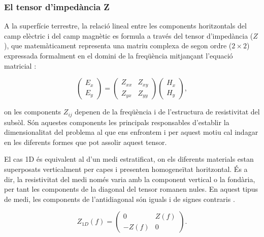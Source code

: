 \documentclass[11pt,a4paper,oneside]{article}
\begin{document}
\subsubsection{El tensor d'impedància Z}

A la superfície terrestre, la relació lineal entre les components horitzontals del camp elèctric i del camp magnètic es formula a través del tensor d'impedància ($Z$), que matemàticament representa una matriu complexa de segon ordre ($2 \times 2$) expressada formalment en el domini de la freqüència mitjançant l'equació matricial \citep{weaver2000}: 

\begin{equation}
    \begin{pmatrix} E_x \\ E_y \end{pmatrix} = \begin{pmatrix} Z_{xx} & Z_{xy} \\ Z_{yx} & Z_{yy} \end{pmatrix} \begin{pmatrix} H_x \\ H_y \end{pmatrix},
    \label{eq:6}
\end{equation}


\noindent
on les components $Z_{ij}$ depenen de la freqüència i de l'estructura de resistivitat del subsòl. Són aquestes components les principals responsables d’establir la dimensionalitat del problema al que ens enfrontem i per aquest motiu cal indagar en les diferents formes que pot assolir aquest tensor.

\vspace{5pt}

El cas 1D és equivalent al d’un medi estratificat, on els diferents materials estan superposats verticalment per capes i presenten homogeneïtat horitzontal. És a dir, la resistivitat del medi només varia amb la component vertical o la fondària, per tant les components de la diagonal del tensor romanen nules. En aquest tipus de medi, les components de l'antidiagonal són iguals i de signes contraris \citep{chavejones2012,weaver2000}. 
\vspace{5pt}

\begin{equation}
    Z_{1D}(f) = \begin{pmatrix} 0 & Z(f) \\ -Z(f) & 0 \end{pmatrix}.
    \label{eq:7}
\end{equation}
\end{document}
